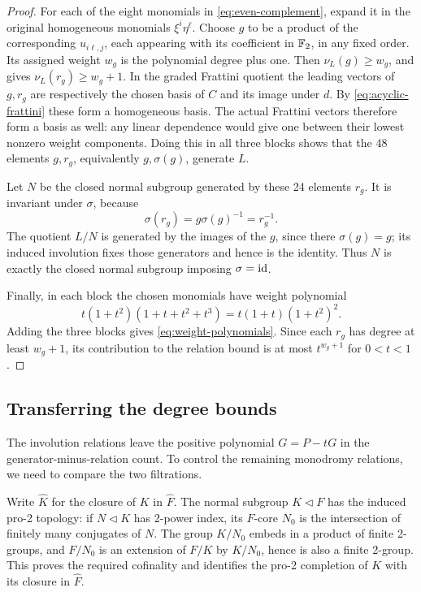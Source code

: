 \begin{proof}
For each of the eight monomials in \eqref{eq:even-complement},
expand it in the original homogeneous monomials \(\xi^i\eta^\ell\).
Choose \(g\) to be a product of the corresponding
\(u_{i\ell,j}\), each appearing with its coefficient in \(\mathbb F_2\),
in any fixed order.  Its assigned weight \(w_g\) is the polynomial
degree plus one.  Then \(\nu_L(g)\ge w_g\), and
 gives \(\nu_L(r_g)\ge w_g+1\).
In the graded Frattini quotient the leading vectors of \(g,r_g\)
are respectively the chosen basis of \(C\) and its image under
\(d\).  By \eqref{eq:acyclic-frattini} these form a homogeneous
basis.  The actual Frattini vectors therefore form a basis as well:
any linear dependence would give one between their lowest nonzero
weight components.  Doing this in all three blocks shows that the
48 elements \(g,r_g\), equivalently \(g,\sigma(g)\), generate \(L\).

Let \(N\) be the closed normal subgroup generated by these 24
elements \(r_g\).  It is invariant under \(\sigma\), because
\[
 \sigma(r_g)=g\sigma(g)^{-1}=r_g^{-1}.
\]
The quotient \(L/N\) is generated by the images of the \(g\), since
there \(\sigma(g)=g\); its induced involution fixes those generators
and hence is the identity.  Thus \(N\) is exactly the closed normal
subgroup imposing \(\sigma=\operatorname{id}\).

Finally, in each block the chosen monomials have weight polynomial
\[
 t(1+t^2)(1+t+t^2+t^3)=t(1+t)(1+t^2)^2.
\]
Adding the three blocks gives \eqref{eq:weight-polynomials}.
Since each \(r_g\) has degree at least \(w_g+1\), its contribution
to the relation bound is at most \(t^{w_g+1}\) for \(0<t<1\).
\end{proof}

\subsection{Transferring the degree bounds}
\label{sec:transfer}

The involution relations leave the positive polynomial \(G=P-tG\)
in the generator-minus-relation count.
To control the remaining monodromy relations, we need to
compare the two filtrations.

Write $\widehat K$ for the closure of $K$ in $\widehat F$.
The normal subgroup $K\triangleleft F$ has the induced pro-2 topology: if $N\triangleleft K$ has 2-power index, its $F$-core $N_0$ is the intersection of finitely many conjugates of $N$. The group $K/N_0$ embeds in a product of finite 2-groups, and $F/N_0$ is an extension of $F/K$ by $K/N_0$, hence is also a finite 2-group. This proves the required cofinality and identifies the pro-2 completion of $K$ with its closure in $\widehat F$.

